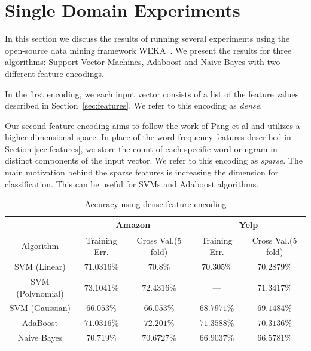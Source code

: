 \documentclass[letterpaper]{article}
\begin{document}
\section{Single Domain Experiments}
\label{sec:single_domain}  
In this section we discuss the results of running several experiments using 
the open-source data mining framework WEKA~\cite{weka}.  We present the results 
for three algorithms: Support Vector Machines, Adaboost and Naive Bayes with 
two different feature encodings.

In the first encoding, we each input vector consists of a list of the feature
values described in Section~\ref{sec:features}. We refer to this encoding as 
\emph{dense}.

Our second feature encoding aims to follow the work of Pang et al 
\cite{PangSentimentClassification} and utilizes a higher-dimensional space. In 
place of the word frequency features described in Section \ref{sec:features}, 
we store the count of each specific word or ngram in distinct components of 
the input vector.  We refer to this encoding as \emph{sparse}. The
main motivation behind the sparse features is increasing the dimension
for classification. This can be useful for SVMs and Adaboost
algorithms.

\begin{table}[ht]
\centering
\begin{tabular}{c | c c | c c}
 & \multicolumn{2}{|c|}{Amazon} & \multicolumn{2}{|c}{Yelp} \\
\hline
Algorithm & Training Err. & Cross Val.(5 fold) & Training Err. & Cross Val.(5 fold)\\
\hline
SVM (Linear) 		& $71.0316\%$ & $70.8\%$ & $70.305\%$ & $70.2879\%$\\
SVM (Polynomial) 	& $73.1041\%$ & $72.4316\%$ & --- & $71.3417\%$\\
SVM (Gaussian) 		& $66.053\%$ & $66.053\%$ & $68.7971\%$ & $69.1484\%$\\
AdaBoost 			& $71.0316\%$ & $72.201\%$ & $71.3588\%$ & $70.3136\%$\\ 
Naive Bayes 		& $70.719\%$ & $70.6727\%$ & $66.9037\%$ & $66.5781\%$\\ 
\end{tabular}
\caption{Accuracy using dense feature encoding}
\label{tab:dense}
\end{table}
\end{document}

